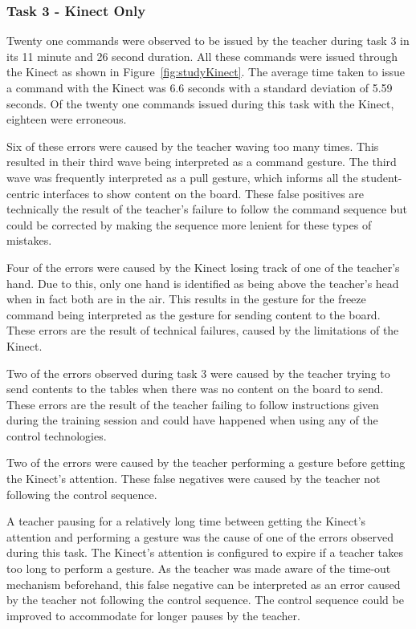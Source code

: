 \documentclass[link]{IWCOMP}
\begin{document}
\subsubsection{Task 3 - Kinect Only}
\label{subsubsec:studyPhase1ResultsTask3}

Twenty one commands were observed to be issued by the teacher during task 3 in its 11 minute and 26 second duration.
All these commands were issued through the Kinect as shown in Figure~\ref{fig:studyKinect}.
The average time taken to issue a command with the Kinect was 6.6 seconds with a standard deviation of 5.59 seconds.
Of the twenty one commands issued during this task with the Kinect, eighteen were erroneous.

Six of these errors were caused by the teacher waving too many times.
This resulted in their third wave being interpreted as a command gesture.
The third wave was frequently interpreted as a pull gesture, which informs all the student-centric interfaces to show content on the board.
These false positives are technically the result of the teacher's failure to follow the command sequence but could be corrected by making the sequence more lenient for these types of mistakes.

Four of the errors were caused by the Kinect losing track of one of the teacher's hand.
Due to this, only one hand is identified as being above the teacher's head when in fact both are in the air.
This results in the gesture for the freeze command being interpreted as the gesture for sending content to the board.
These errors are the result of technical failures, caused by the limitations of the Kinect.

Two of the errors observed during task 3 were caused by the teacher trying to send contents to the tables when there was no content on the board to send.
These errors are the result of the teacher failing to follow instructions given during the training session and could have happened when using any of the control technologies.

Two of the errors were caused by the teacher performing a gesture before getting the Kinect's attention.
These false negatives were caused by the teacher not following the control sequence.

A teacher pausing for a relatively long time between getting the Kinect's attention and performing a gesture was the cause of one of the errors observed during this task.
The Kinect's attention is configured to expire if a teacher takes too long to perform a gesture.
As the teacher was made aware of the time-out mechanism beforehand, this false negative can be interpreted as an error caused by the teacher not following the control sequence.
The control sequence could be improved to accommodate for longer pauses by the teacher.
\end{document}
